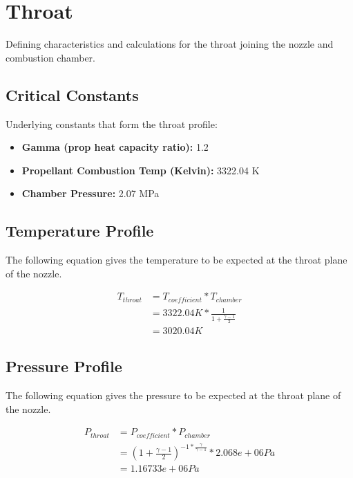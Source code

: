 \documentclass[12pt]{report}
\begin{document}
\section{Throat}

Defining characteristics and calculations for the throat joining the nozzle and combustion chamber.


\subsection{Critical Constants}

Underlying constants that form the throat profile:

\begin{itemize}
	\item \textbf{Gamma (prop heat capacity ratio): } 1.2 
	\item \textbf{Propellant Combustion Temp (Kelvin): } 3322.04 K 
	\item \textbf{Chamber Pressure: } 2.07 MPa 
\end{itemize}




\subsection{Temperature Profile}

The following equation gives the temperature to be expected at the throat plane of the nozzle.

\begin{equation}
\begin{split}
\boldsymbol{\mathit{T_{throat}}} & = \boldsymbol{\mathit{T_{coefficient}}} * \boldsymbol{\mathit{T_{chamber}}}\\
 & = 3322.04 K * \frac{1}{1 + \frac{\boldsymbol{\mathit{\gamma}} - 1}{2}}\\
 & = 3020.04 K
\end{split}
\end{equation}




\subsection{Pressure Profile}

The following equation gives the pressure to be expected at the throat plane of the nozzle.

\begin{equation}
\begin{split}
\boldsymbol{\mathit{P_{throat}}} & = \boldsymbol{\mathit{P_{coefficient}}} * \boldsymbol{\mathit{P_{chamber}}}\\
 & = {\left(1 + \frac{\boldsymbol{\mathit{\gamma}} - 1}{2}\right)}^{-1 * \frac{\boldsymbol{\mathit{\gamma}}}{\boldsymbol{\mathit{\gamma}} - 1}} * 2.068e+06 Pa\\
 & = 1.16733e+06 Pa
\end{split}
\end{equation}
\end{document}
